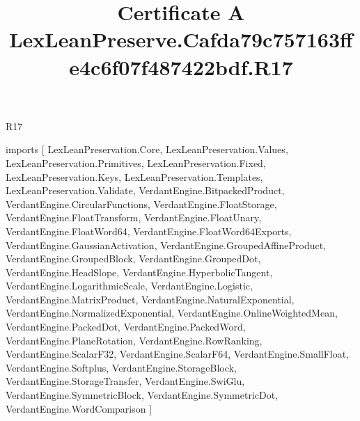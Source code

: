 \begin{lexlean}{R17}
\title{Certificate A LexLeanPreserve.Cafda79c757163ffe4c6f07f487422bdf.R17}
\begin{coremodule}
imports [
  LexLeanPreservation.Core,
  LexLeanPreservation.Values,
  LexLeanPreservation.Primitives,
  LexLeanPreservation.Fixed,
  LexLeanPreservation.Keys,
  LexLeanPreservation.Templates,
  LexLeanPreservation.Validate,
  VerdantEngine.BitpackedProduct,
  VerdantEngine.CircularFunctions,
  VerdantEngine.FloatStorage,
  VerdantEngine.FloatTransform,
  VerdantEngine.FloatUnary,
  VerdantEngine.FloatWord64,
  VerdantEngine.FloatWord64Exports,
  VerdantEngine.GaussianActivation,
  VerdantEngine.GroupedAffineProduct,
  VerdantEngine.GroupedBlock,
  VerdantEngine.GroupedDot,
  VerdantEngine.HeadSlope,
  VerdantEngine.HyperbolicTangent,
  VerdantEngine.LogarithmicScale,
  VerdantEngine.Logistic,
  VerdantEngine.MatrixProduct,
  VerdantEngine.NaturalExponential,
  VerdantEngine.NormalizedExponential,
  VerdantEngine.OnlineWeightedMean,
  VerdantEngine.PackedDot,
  VerdantEngine.PackedWord,
  VerdantEngine.PlaneRotation,
  VerdantEngine.RowRanking,
  VerdantEngine.ScalarF32,
  VerdantEngine.ScalarF64,
  VerdantEngine.SmallFloat,
  VerdantEngine.Softplus,
  VerdantEngine.StorageBlock,
  VerdantEngine.StorageTransfer,
  VerdantEngine.SwiGlu,
  VerdantEngine.SymmetricBlock,
  VerdantEngine.SymmetricDot,
  VerdantEngine.WordComparison
]


\end{coremodule}
\end{lexlean}
